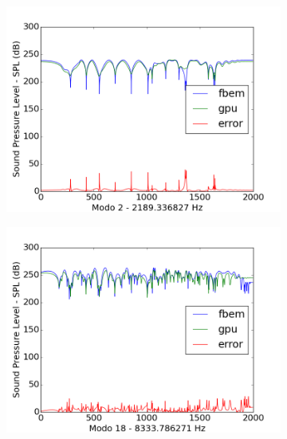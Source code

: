 \begin{figure}[ht]
\begin{subfigure}{0.45\textwidth}
	\includegraphics[width=\textwidth]{../data/transfer_test/ceramic_plate/plots/ceramic_plate-tfv-0_2.png}
	\label{fig:coef_plate_2}
	\caption{}
\end{subfigure}
\begin{subfigure}{0.45\textwidth}
	\centering
	\includegraphics[width=\textwidth]{../data/transfer_test/ceramic_plate/plots/ceramic_plate-tfv-0_18.png}
	\caption{}
	\label{fig:coef_plate_18}
\end{subfigure}%
\begin{subfigure}{0.45\textwidth}
	\centering

\end{subfigure}
\end{figure}
